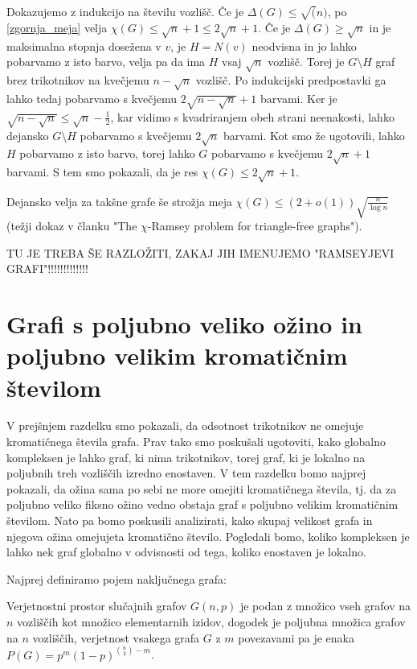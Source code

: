 \documentclass[mat1, tisk]{fmfdelo}
\begin{document}
    \begin{dokaz}
        Dokazujemo z indukcijo na številu vozlišč. Če je $\Delta(G) \leq \sqrt(n)$, po \ref{zgornja_meja} velja $\chi(G) \leq \sqrt{n} + 1 \leq 2\sqrt{n} + 1$. Če je $\Delta(G) \geq \sqrt{n}$ in je maksimalna stopnja dosežena v $v$, je $H = N(v)$ neodvisna in jo lahko pobarvamo z isto barvo, velja
        pa da ima $H$ vsaj $\sqrt{n}$ vozlišč. Torej je $G \setminus H$ graf brez trikotnikov na kvečjemu $n - \sqrt{n}$ vozlišč. Po indukcijski predpostavki ga lahko tedaj pobarvamo s kvečjemu $2\sqrt{n - \sqrt{n}} + 1$ barvami. Ker je $\sqrt{n - \sqrt{n}} \leq \sqrt{n} - \frac{1}{2}$, kar vidimo
        s kvadriranjem obeh strani neenakosti, lahko dejansko $G \setminus H$ pobarvamo s kvečjemu $2\sqrt{n}$ barvami. Kot smo že ugotovili, lahko $H$ pobarvamo z isto barvo, torej lahko $G$ pobarvamo s kvečjemu $2\sqrt{n} + 1$ barvami. S tem smo pokazali, da je res $\chi(G) \leq 2\sqrt{n} + 1$.
    \end{dokaz}

Dejansko velja za takšne grafe še strožja meja $\chi(G) \leq (2 + o(1))\sqrt{\frac{n}{\log{n}}}$ (težji dokaz v članku "The $\chi$-Ramsey problem for triangle-free graphs").

TU JE TREBA ŠE RAZLOŽITI, ZAKAJ JIH IMENUJEMO "RAMSEYJEVI GRAFI"!!!!!!!!!!!!!

\section{Grafi s poljubno veliko ožino in poljubno velikim kromatičnim številom}
V prejšnjem razdelku smo pokazali, da odsotnost trikotnikov ne omejuje kromatičnega števila grafa. Prav tako smo poskušali ugotoviti, kako globalno kompleksen je lahko graf, ki nima trikotnikov, torej graf,
ki je lokalno na poljubnih treh vozliščih izredno enostaven. V tem razdelku bomo najprej pokazali, da ožina sama po sebi ne more omejiti kromatičnega števila, tj. da za poljubno veliko fiksno ožino vedno obstaja
graf s poljubno velikim kromatičnim številom. Nato pa bomo poskusili analizirati, kako skupaj velikost grafa in njegova ožina omejujeta kromatično število. Pogledali bomo, koliko kompleksen je lahko nek graf globalno 
v odvisnosti od tega, koliko enostaven je lokalno.

Najprej definiramo pojem naključnega grafa:

    \begin{definicija}
        Verjetnostni prostor slučajnih grafov $G(n, p)$ je podan z množico vseh grafov na $n$ vozliščih kot množico elementarnih izidov, dogodek je poljubna množica grafov na $n$ vozliščih, verjetnost vsakega grafa $G$
        z $m$ povezavami pa je enaka $P(G) = p^m(1 - p)^{\binom{n}{2}-m}$.
    \end{definicija}
\end{document}
